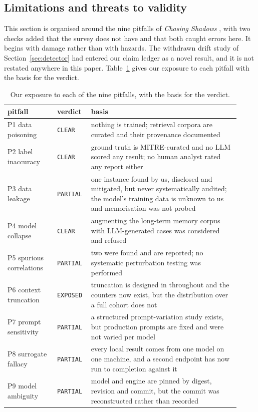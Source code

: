 \subsection{Limitations and threats to validity}
\label{sec:limitations}

This section is organised around the nine pitfalls of \emph{Chasing Shadows}
\citep{evertz2026chasing}, with two checks added that the survey does not have and that both caught
errors here. It begins with damage rather than with hazards. The withdrawn drift study of
Section~\ref{sec:detector} had entered our claim ledger as a novel result, and it is not restated
anywhere in this paper.
Table~\ref{tab:pitfalls} gives our exposure to each pitfall with the basis for the verdict.

\begin{table}[!htbp]
\caption{Our exposure to each of the nine pitfalls, with the basis for the verdict.}\label{tab:pitfalls}
\centering\small
\begin{tabular}{@{}
  >{\raggedright\arraybackslash}p{0.20\linewidth}
  >{\raggedright\arraybackslash}p{0.12\linewidth}
  >{\raggedright\arraybackslash}p{0.60\linewidth}@{}}
\toprule
pitfall & verdict & basis \\
\midrule
P1 data poisoning & \texttt{CLEAR} & nothing is trained; retrieval corpora are curated and their provenance documented \\
P2 label inaccuracy & \texttt{CLEAR} & ground truth is MITRE-curated and no LLM scored any result; no human analyst rated any report either \\
P3 data leakage & \texttt{PARTIAL} & one instance found by us, disclosed and mitigated, but never systematically audited; the model's training data is unknown to us and memorisation was not probed \\
P4 model collapse & \texttt{CLEAR} & augmenting the long-term memory corpus with LLM-generated cases was considered and refused \\
P5 spurious correlations & \texttt{PARTIAL} & two were found and are reported; no systematic perturbation testing was performed \\
P6 context truncation & \texttt{EXPOSED} & truncation is designed in throughout and the counters now exist, but the distribution over a full cohort does not \\
P7 prompt sensitivity & \texttt{PARTIAL} & a structured prompt-variation study exists, but production prompts are fixed and were not varied per model \\
P8 surrogate fallacy & \texttt{PARTIAL} & every local result comes from one model on one machine, and a second endpoint has now run to completion against it \\
P9 model ambiguity & \texttt{PARTIAL} & model and engine are pinned by digest, revision and commit, but the commit was reconstructed rather than recorded \\
\bottomrule
\end{tabular}
\end{table}
